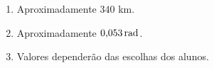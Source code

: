 \documentclass[10 pt,usenames,dvipsnames, oneside]{article}
\begin{document}
\ifdefined\prof
\begin{solucao}

\begin{enumerate}
\item Aproximadamente $340$ km.
\item Aproximadamente $0{,}053\operatorname{rad}$.
\item Valores dependerão das escolhas dos alunos.
\end{enumerate}

\end{solucao}
\fi
\end{document}
